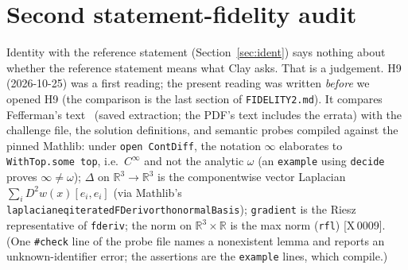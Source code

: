 \documentclass[10pt]{article}
\newcommand{\R}{\mathbb{R}}
\newcommand{\tg}[2]{\texorpdfstring{\textsf{[#1\,#2]}}{}}  %
\newcommand{\lean}[1]{\texttt{#1}}
\renewcommand{\_}{\textunderscore\allowbreak}
\begin{document}
\section{Second statement-fidelity audit}\label{sec:fid}
Identity with the reference statement (Section~\ref{sec:ident}) says nothing about whether the reference statement means what Clay asks. That is a judgement. H9~\cite{h9} (2026-10-25) was a first reading; the present reading was written \emph{before} we opened H9 (the comparison is the last section of \texttt{FIDELITY2.md}).
It compares Fefferman's text~\cite{fef} (saved extraction; the PDF's text includes the errata) with the challenge file, the solution definitions, and semantic probes compiled against the pinned Mathlib: under \lean{open ContDiff}, the notation $\infty$ elaborates to \lean{WithTop.some top}, i.e.\ $C^\infty$ and not the analytic $\omega$ (an \lean{example} using \lean{decide} proves $\infty\neq\omega$);
$\Delta$ on $\R^3\to\R^3$ is the componentwise vector Laplacian $\sum_i D^2w(x)[e_i,e_i]$ (via Mathlib's \lean{laplacian\_eq\_iteratedFDeriv\_orthonormalBasis}); \lean{gradient} is the Riesz representative of \lean{fderiv}; the norm on $\R^3\times\R$ is the max norm (\lean{rfl}) \tg{X}{0009}.
(One \lean{\#check} line of the probe file names a nonexistent lemma and reports an unknown-identifier error; the assertions are the \lean{example} lines, which compile.)
\end{document}
